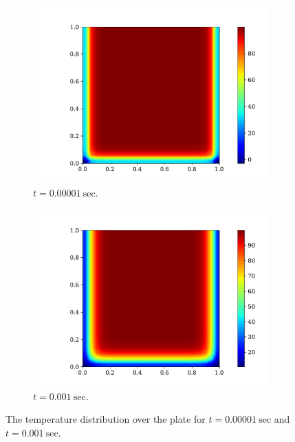 \documentclass[a4paper, 11pt]{article}
\begin{document}
\begin{figure}[ht!]
\centering
\begin{subfigure}{0.5\textwidth}
  \centering
  \includegraphics[width=1\linewidth]{0d00001sec.pdf}
  \caption{$t = 0.00001 \ \text{sec}$.}
  \label{fig:sub31}
\end{subfigure}%
\begin{subfigure}{0.5\textwidth}
  \centering
  \includegraphics[width=1\linewidth]{0d001sec.pdf}
  \caption{$t = 0.001 \ \text{sec}$.}
  \label{fig:sub2}
\end{subfigure}
\caption{The temperature distribution over the plate for $t = 0.00001 \ \text{sec}$ and $t = 0.001 \ \text{sec}$.}
\label{fig:sub32}
\end{figure}
\end{document}
